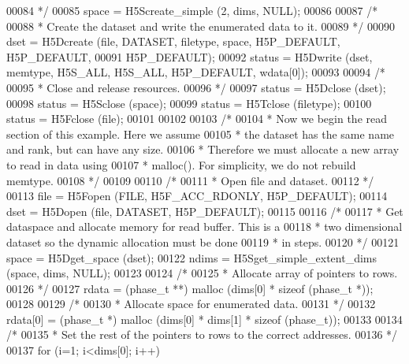 \begin{DoxyCode}
00084 \textcolor{comment}{     */}
00085     space = H5Screate\_simple (2, dims, NULL);
00086 
00087     \textcolor{comment}{/*}
00088 \textcolor{comment}{     * Create the dataset and write the enumerated data to it.}
00089 \textcolor{comment}{     */}
00090     dset = H5Dcreate (file, DATASET, filetype, space, H5P\_DEFAULT, H5P\_DEFAULT,
00091                 H5P\_DEFAULT);
00092     status = H5Dwrite (dset, memtype, H5S\_ALL, H5S\_ALL, H5P\_DEFAULT, wdata[0]);
00093 
00094     \textcolor{comment}{/*}
00095 \textcolor{comment}{     * Close and release resources.}
00096 \textcolor{comment}{     */}
00097     status = H5Dclose (dset);
00098     status = H5Sclose (space);
00099     status = H5Tclose (filetype);
00100     status = H5Fclose (file);
00101 
00102 
00103     \textcolor{comment}{/*}
00104 \textcolor{comment}{     * Now we begin the read section of this example.  Here we assume}
00105 \textcolor{comment}{     * the dataset has the same name and rank, but can have any size.}
00106 \textcolor{comment}{     * Therefore we must allocate a new array to read in data using}
00107 \textcolor{comment}{     * malloc().  For simplicity, we do not rebuild memtype.}
00108 \textcolor{comment}{     */}
00109 
00110     \textcolor{comment}{/*}
00111 \textcolor{comment}{     * Open file and dataset.}
00112 \textcolor{comment}{     */}
00113     file = H5Fopen (FILE, H5F\_ACC\_RDONLY, H5P\_DEFAULT);
00114     dset = H5Dopen (file, DATASET, H5P\_DEFAULT);
00115 
00116     \textcolor{comment}{/*}
00117 \textcolor{comment}{     * Get dataspace and allocate memory for read buffer.  This is a}
00118 \textcolor{comment}{     * two dimensional dataset so the dynamic allocation must be done}
00119 \textcolor{comment}{     * in steps.}
00120 \textcolor{comment}{     */}
00121     space = H5Dget\_space (dset);
00122     ndims = H5Sget\_simple\_extent\_dims (space, dims, NULL);
00123 
00124     \textcolor{comment}{/*}
00125 \textcolor{comment}{     * Allocate array of pointers to rows.}
00126 \textcolor{comment}{     */}
00127     rdata = (phase\_t **) malloc (dims[0] * \textcolor{keyword}{sizeof} (phase\_t *));
00128 
00129     \textcolor{comment}{/*}
00130 \textcolor{comment}{     * Allocate space for enumerated data.}
00131 \textcolor{comment}{     */}
00132     rdata[0] = (phase\_t *) malloc (dims[0] * dims[1] * \textcolor{keyword}{sizeof} (phase\_t));
00133 
00134     \textcolor{comment}{/*}
00135 \textcolor{comment}{     * Set the rest of the pointers to rows to the correct addresses.}
00136 \textcolor{comment}{     */}
00137     \textcolor{keywordflow}{for} (i=1; i<dims[0]; i++)

\end{DoxyCode}
